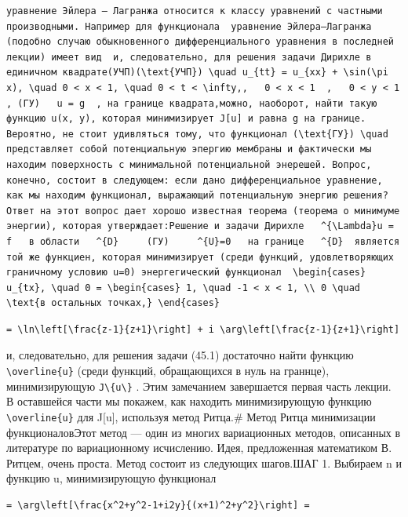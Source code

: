 \documentclass[
  ukrainian,
]{article}
\begin{document}
\begin{verbatim}
уравнение Эйлера — Лагранжа относится к классу уравнений с частными производными. Например для функционала  уравнение Эйлера—Лагранжа (подобно случаю обыкновенного дифференциального уравнения в последней лекции) имеет вид  и, следовательно, для решения задачи Дирихле в единичном квадрате(УЧП)(\text{УЧП}) \quad u_{tt} = u_{xx} + \sin(\pi x), \quad 0 < x < 1, \quad 0 < t < \infty,,   0 < x < 1  ,   0 < y < 1  , (ГУ)   u = g  , на границе квадрата,можно, наоборот, найти такую функцию u(x, y), которая минимизирует J[u] и равна g на границе. Вероятно, не стоит удивляться тому, что функционал (\text{ГУ}) \quad представляет собой потенциальную эпергию мембраны и фактически мы находим поверхность с минимальной потенциальной энерешей. Вопрос, конечно, состоит в следующем: если дано дифференциальное уравнение, как мы находим функционал, выражающий потенциальную энергию решения? Ответ на этот вопрос дает хорошо известная теорема (теорема о минимуме энергии), которая утверждает:Решение и задачи Дирихле   ^{\Lambda}u = f   в области   ^{D}     (ГУ)     ^{U}=0   на границе   ^{D}  является той же функциен, которая минимизирует (среди функций, удовлетворяющих граничному условию u=0) энергегический функционал  \begin{cases} u_{tx}, \quad 0 = \begin{cases} 1, \quad -1 < x < 1, \\ 0 \quad \text{в остальных точках,} \end{cases}
\end{verbatim}

\begin{verbatim}
= \ln\left[\frac{z-1}{z+1}\right] + i \arg\left[\frac{z-1}{z+1}\right]
\end{verbatim}

и, следовательно, для решения задачи (45.1) достаточно найти функцию
\texttt{\textbackslash{}overline\{u\}} (среди функций, обращающихся в
нуль на граннце), минимизирующую
\texttt{J\textbackslash{}\{u\textbackslash{}\}} . Этим замечанием
завершается первая часть лекции. В оставшейся части мы покажем, как
находить минимизирующую функцию \texttt{\textbackslash{}overline\{u\}}
для J{[}u{]}, используя метод Ритца.\# Метод Ритца минимизации
функционаловЭтот метод --- один из многих вариационных методов,
описанных в литературе по вариационному исчислению. Идея, предложенная
математиком В. Ритцем, очень проста. Метод состоит из следующих
шагов.ШАГ 1. Выбираем n и функцию u, минимизирующую функционал

\begin{verbatim}
= \arg\left[\frac{x^2+y^2-1+i2y}{(x+1)^2+y^2}\right] =
\end{verbatim}
\end{document}
